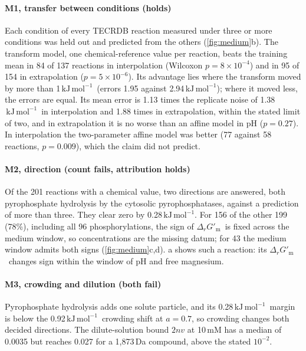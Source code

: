 \documentclass[5p]{elsarticle}
\theoremstyle{definition}
\theoremstyle{plain}
\newcommand{\kJ}{\ensuremath{\,\mathrm{kJ\,mol^{-1}}}}
\newcommand{\DGm}{\ensuremath{\Delta_r G'_{\mathrm{m}}}}
\begin{document}
\paragraph{M1, transfer between conditions (holds)}
Each condition of every TECRDB reaction measured under three or more conditions was held out and predicted from the others (\cref{fig:medium}b).
The transform model, one chemical-reference value per reaction, beats the training mean in 84 of 137 reactions in interpolation (Wilcoxon $p=8\times10^{-4}$) and in 95 of 154 in extrapolation ($p=5\times10^{-6}$).
Its advantage lies where the transform moved by more than 1\kJ\ (errors 1.95 against 2.94\kJ); where it moved less, the errors are equal.
Its mean error is 1.13 times the replicate noise of 1.38\kJ\ in interpolation and 1.88 times in extrapolation, within the stated limit of two, and in extrapolation it is no worse than an affine model in pH ($p=0.27$).
In interpolation the two-parameter affine model was better (77 against 58 reactions, $p=0.009$), which the claim did not predict.

\paragraph{M2, direction (count fails, attribution holds)}
Of the 201 reactions with a chemical value, two directions are answered, both pyrophosphate hydrolysis by the cytosolic pyrophosphatases, against a prediction of more than three.
They clear zero by 0.28\kJ.
For 156 of the other 199 (78\%), including all 96 phosphorylations, the sign of \DGm\ is fixed across the medium window, so concentrations are the missing datum; for 43 the medium window admits both signs (\cref{fig:medium}c,d).
a shows such a reaction: its \DGm\ changes sign within the window of pH and free magnesium.

\paragraph{M3, crowding and dilution (both fail)}
Pyrophosphate hydrolysis adds one solute particle, and its 0.28\kJ\ margin is below the 0.92\kJ\ crowding shift at $a=0.7$, so crowding changes both decided directions.
The dilute-solution bound $2nv$ at 10\,mM has a median of 0.0035 but reaches 0.027 for a 1{,}873\,Da compound, above the stated $10^{-2}$.
\end{document}
